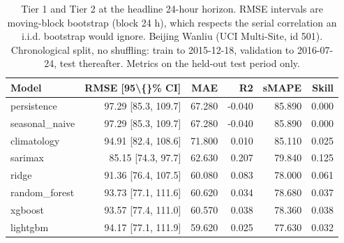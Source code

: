 \begin{table}[htbp]
\caption{Tier 1 and Tier 2 at the headline 24-hour horizon. RMSE intervals are moving-block bootstrap (block 24 h), which respects the serial correlation an i.i.d. bootstrap would ignore. Beijing Wanliu (UCI Multi-Site, id 501). Chronological split, no shuffling: train to 2015-12-18, validation to 2016-07-24, test thereafter. Metrics on the held-out test period only.}
\label{tab:tier1_tier2_h24}
\begin{tabular}{lrrrrr}
\toprule
Model & RMSE [95\textbackslash\{\}\% CI] & MAE & R2 & sMAPE & Skill \\
\midrule
persistence & 97.29 [85.3, 109.7] & 67.280 & -0.040 & 85.890 & 0.000 \\
seasonal\_naive & 97.29 [85.3, 109.7] & 67.280 & -0.040 & 85.890 & 0.000 \\
climatology & 94.91 [82.4, 108.6] & 71.800 & 0.010 & 85.110 & 0.025 \\
sarimax & 85.15 [74.3, 97.7] & 62.630 & 0.207 & 79.840 & 0.125 \\
ridge & 91.36 [76.4, 107.5] & 60.080 & 0.083 & 78.000 & 0.061 \\
random\_forest & 93.73 [77.1, 111.6] & 60.620 & 0.034 & 78.680 & 0.037 \\
xgboost & 93.57 [77.4, 111.0] & 60.570 & 0.038 & 78.360 & 0.038 \\
lightgbm & 94.17 [77.1, 111.9] & 59.620 & 0.025 & 77.630 & 0.032 \\
\bottomrule
\end{tabular}
\end{table}
